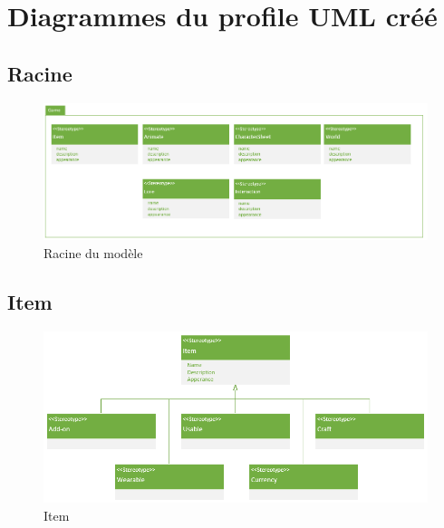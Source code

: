 \appendix
\chapter{Diagrammes du profile UML créé}

\section{Racine}
\begin{figure}[H]
    \begin{center}
    \includegraphics[width=14cm]{10_img/Z_annexeA/00.PNG} 
    \caption{Racine du modèle}
    \label{A-racine}
    \end{center}
\end{figure}

\newpage
\section{Item}
\begin{figure}[H]
    \begin{center}
    \includegraphics[width=\linewidth]{10_img/Z_annexeA/item_racine.PNG} 
    \caption{Item}
    \label{A-item-racine}
    \end{center}
\end{figure}

